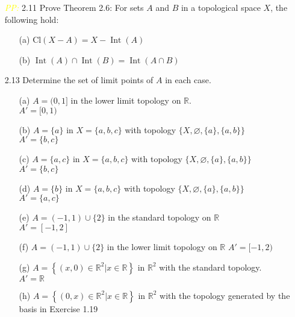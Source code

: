 \documentclass[12pt]{article}
\newcommand{\R}{\mathbb{R}}
\newcommand{\pp}{\textit{\textcolor{yellow}{PP: }}}%
\begin{document}
\begin{enumerate}
		\item[\pp2.11] Prove Theorem 2.6: For sets $ A $ and $ B $ in a topological space $ X $, the following hold:
		\begin{enumerate}
			\item[(a)] $\mathrm { Cl } ( X - A ) = X - \operatorname { Int } ( A )$\\
			\item[(b)] $\operatorname { Int } ( A ) \cap \operatorname { Int } ( B ) = \operatorname { Int } ( A \cap B )$\\
		\end{enumerate}
		
		
		
		\item[2.13] Determine the set of limit points of $ A $ in each case.
		\begin{enumerate}
			\item[(a)] $A=(0,1]$ in the lower limit topology on $\mathbb{R}$.\\
			$ A'=[0,1) $
			\item[(b)] $A=\{a\}$ in $X=\{a, b, c\}$ with topology $\{X, \varnothing,\{a\},\{a, b\}\}$\\
			$ A' = \{b,c\} $
			\item[(c)] $A=\{a, c\}$ in $X=\{a, b, c\}$ with topology $\{X, \varnothing,\{a\},\{a, b\}\}$\\
			$ A' = \{b,c\} $
			\item[(d)] $A=\{b\}$ in $X=\{a, b, c\}$ with topology $\{X, \varnothing,\{a\},\{a, b\}\}$\\
			$ A' = \{a,c\} $
			\item[(e)] $ A=(-1,1) \cup\{2\}$ in the standard topology on $\mathbb{R}$\\
			$ A'=[-1,2] $
			\item[(f)] $A=(-1,1) \cup\{2\}$ in the lower limit topology on $\mathbb{R}$
			$ A'=[-1,2) $
			\item[(g)] $A=\left\{(x, 0) \in \mathbb{R}^{2} | x \in \mathbb{R}\right\}$ in $\mathbb{R}^{2}$ with the standard topology.\\
			$ A' = \R $
			\item[(h)] $A=\left\{(0, x) \in \mathbb{R}^{2} | x \in \mathbb{R}\right\}$ in $\mathbb{R}^{2}$ with the topology generated by the basis in Exercise 1.19\\
			

\end{enumerate}
\end{enumerate}
\end{document}

